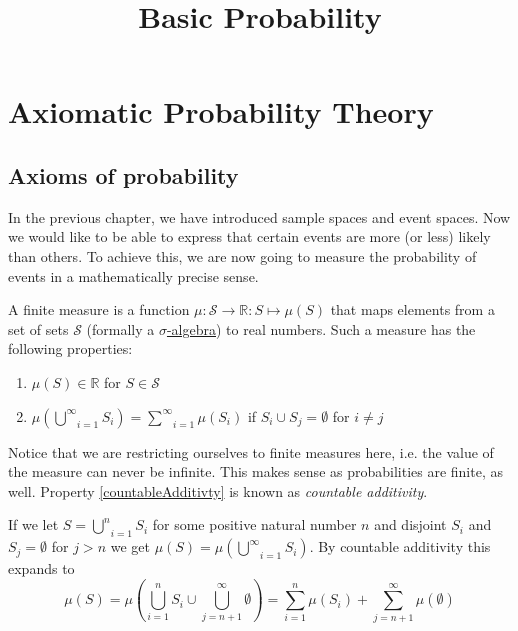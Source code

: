 \documentclass[a4paper,11pt,leqno]{report}
\title{Basic Probability}
\date{}
\begin{document}
\chapter{Axiomatic Probability Theory}

\section{Axioms of probability}
In the previous chapter, we have introduced sample spaces and event spaces. Now we would like to be able
to express that certain events are more (or less) likely than others. 
To achieve this, we are now going to measure the probability of events in a mathematically precise sense. 

\begin{Definition}\label{axioms}
A finite measure is a function $ \mu: \mathcal{S} \rightarrow \mathbb{R} : S \mapsto \mu (S) $ 
that maps elements
from a set of sets $ \mathcal{S} $ (formally a \href{http://en.wikipedia.org/wiki/Sigma-algebra}
{$ \sigma $-algebra}) to real numbers. Such a measure has the following properties:
\begin{enumerate}
\item $ \mu(S) \in \mathbb{R} $ for $ S \in \mathcal{S} $
\item $ \mu\left( \underset{i = 1}{\overset{\infty}{\bigcup}} S_{i} \right)
= \underset{i = 1}{\overset{\infty}{\sum}} \mu \left( S_{i} \right) $ if $ S_{i}\cup S_{j} = \emptyset $ 
for $ i \not = j $ \label{countableAdditivty}
\end{enumerate}
\end{Definition}

Notice that we are restricting ourselves to finite measures here, i.e. the value of the measure can never
be infinite. This makes sense as probabilities are finite, as well. Property \ref{countableAdditivty} is 
known as  \textit{countable additivity}. 

If we let 
$ S = \underset{i=1}{\overset{n}{\bigcup}} S_{i} $ for some positive natural number $ n $ and disjoint 
$ S_{i} $ and $ S_{j} = 
\emptyset $ for $ j > n $ we get $ \mu(S) = \mu(\underset{i=1}{\overset{\infty}{\bigcup}} S_{i}) $. By
countable additivity this expands to
\begin{equation}
\mu(S) = \mu \left( \underset{i=1}{\overset{n}{\bigcup}} S_{i} \cup 
\underset{j=n+1}{\overset{\infty}{\bigcup}} \emptyset \right) 
= \underset{i=1}{\overset{n}{\sum}} \mu ( S_{i} )
+ \underset{j=n+1}{\overset{\infty}{\sum}} \mu ({\emptyset})
\end{equation}
\end{document}
